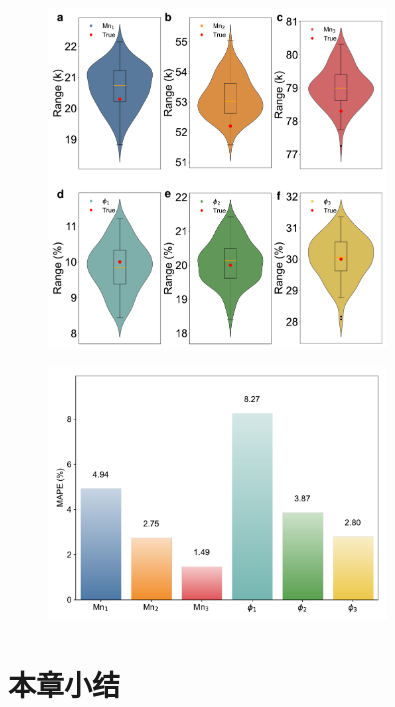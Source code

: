 \begin{figure}[htbp]
  \centering
  \includegraphics[width=0.8\textwidth]{Fig/reverse-violin.pdf}
\end{figure}

\begin{figure}[htbp]
  \centering
  \includegraphics[width=0.8\textwidth]{Fig/MAPE_bar_chart.pdf}
\end{figure}

\section{本章小结}